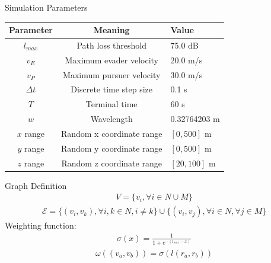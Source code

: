 \begin{frame}{Simulation Parameters}
	\begin{table}
		\begin{tabular}{ccl}
			\hline
			Parameter  & Meaning                                    & Value                         \\
			\hline
			$l_{max}$  & Path loss threshold                        & 75.0 dB                       \\
			$v_E$      & Maximum evader velocity                    & 20.0 m/s                      \\
			$v_P$      & Maximum pursuer velocity                   & 30.0 m/s                      \\
			$\Delta t$ & Discrete time step size                    & 0.1 s                         \\
			$T$        & Terminal time                              & 60 s                          \\
			$w$        & Wavelength                                 & 0.32764203 m \footnotemark[1] \\
			$x$ range  & Random x coordinate range                  & $[0, 500]$ m                  \\
			$y$ range  & Random y coordinate range                  & $[0, 500]$ m                  \\
			$z$ range  & Random z coordinate range \footnotemark[2] & $[20, 100]$ m                 \\
			\hline
		\end{tabular}
	\end{table}
\end{frame}

\begin{frame}{Graph Definition}
	\begin{align*}
		V = \{v_i, \forall i \in N \cup M\}
	\end{align*}
	\begin{align*}
		\mathcal{E} = \{(v_i, v_k), \forall i, k \in N, i \ne k\} \cup \{(v_i, v_j), \forall i \in N, \forall j \in M\}
	\end{align*}
    Weighting function:
	\begin{align*}
		\sigma(x) = \frac{1}{1 + e^{-(l_{max} - x)}}
	\end{align*}
	\begin{align*}
		\omega((v_a, v_b)) = \sigma(l(r_a, r_b))
	\end{align*}
\end{frame}

